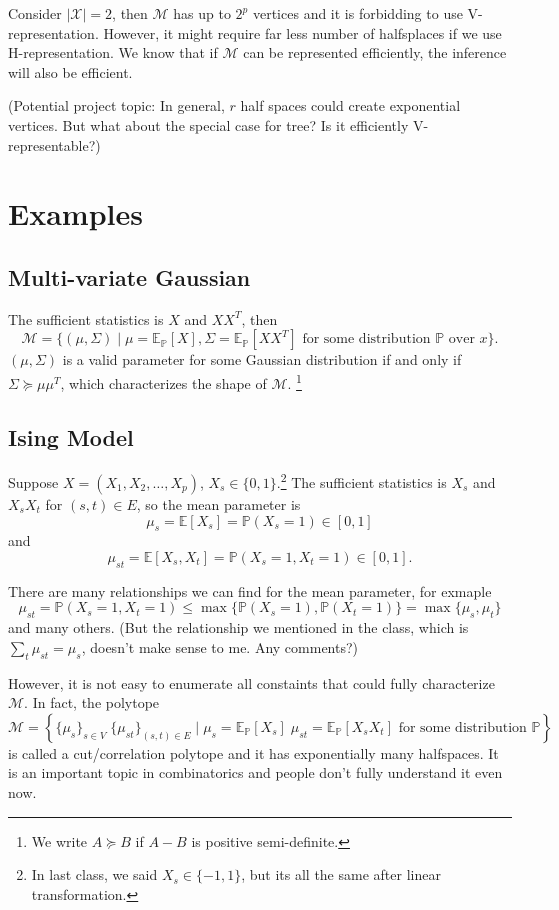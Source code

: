 \documentclass[11pt]{article}
\newcommand{\Xc}{\mathcal{X}}
\newcommand{\Mc}{\mathcal{M}}
\newcommand{\E}{\mathbb{E}}
\newcommand{\prob}{\mathbb{P}}
\newcommand{\1}{\mathbbm{1}}
\begin{document}
Consider $|\Xc| = 2$, then $\Mc$ has up to $2^p$ vertices and it is forbidding to use V-representation. However,
it might require far less number of halfsplaces if we use H-representation. We know that if $\Mc$ can be
represented efficiently, the inference will also be efficient.

(Potential project topic: In general, $r$ half spaces could create exponential vertices. But what about the
special case for tree? Is it efficiently V-representable?)

\section{Examples}
\subsection{Multi-variate Gaussian}
The sufficient statistics is $X$ and $XX^T$, then
\[
\Mc = \{(\mu, \Sigma) \; | \; \mu = \E_\prob[X], \Sigma = \E_\prob[XX^T] 
\text{ for some distribution } \prob \text{ over } x \}.
\]
$(\mu, \Sigma)$ is a valid parameter for some Gaussian distribution if and only if
$\Sigma \succeq \mu\mu^T$, which characterizes the shape of $\Mc$.
\footnote{We write $A \succeq B$ if $A-B$ is positive semi-definite.}

\subsection{Ising Model}
Suppose $X = (X_1, X_2, \ldots, X_p)$, $X_s \in \{0, 1\}$.\footnote{In last class, we said $X_s \in \{-1, 1\}$,
but its all the same after linear transformation.} The sufficient statistics is $X_s$ and $X_sX_t$ for
$(s,t) \in E$, so the mean parameter is
\[
\mu_s = \E[X_s] = \prob(X_s = 1) \in [0, 1]
\]
and
\[\mu_{st} = \E[X_s, X_t] = \prob(X_s = 1, X_t = 1) \in [0,1].
\]

There are many relationships we can find for the mean parameter, for exmaple
\[
\mu_{st} = \prob(X_s=1, X_t=1) \leq \max\{\prob(X_s=1), \prob(X_t=1)\} = \max\{\mu_s, \mu_t\}
\]
and many others.
(But the relationship we mentioned in the class, which is $\sum_t \mu_{st} = \mu_s$, doesn't make sense to me.
Any comments?) 

However, it is not easy to enumerate all constaints that could fully characterize $\Mc$. In fact, the polytope
\[
\Mc = \left\{ \{\mu_s\}_{s\in V} \; \{\mu_{st}\}_{(s,t) \in E} \; | \;
\mu_s = \E_\prob[X_s] \; \mu_{st} = \E_\prob[X_sX_t] \text{ for some distribution } \prob \right\}
\]
is called a cut/correlation polytope and it has exponentially many halfspaces. It is an important topic
in combinatorics and people don't fully understand it even now.
\end{document}
